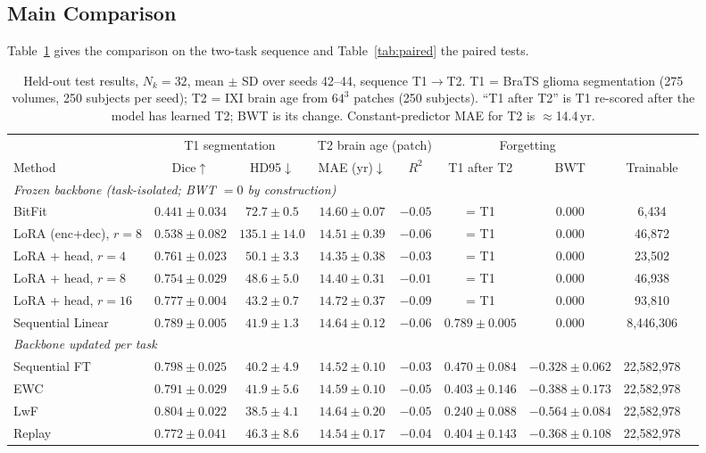 \documentclass[journal,twoside,web]{ieeecolor}
\begin{document}
\subsection{Main Comparison}
\label{sec:main}

Table~\ref{tab:main} gives the comparison on the two-task sequence and Table~\ref{tab:paired} the paired tests.

\begin{table}[t]
\caption{Held-out test results, $N_k=32$, mean $\pm$ SD over seeds 42--44, sequence T1$\to$T2. T1 = BraTS glioma segmentation (275 volumes, 250 subjects per seed); T2 = IXI brain age from $64^3$ patches (250 subjects). ``T1 after T2'' is T1 re-scored after the model has learned T2; BWT is its change. Constant-predictor MAE for T2 is $\approx$14.4\,yr.}
\label{tab:main}
\centering
\scriptsize
\setlength{\tabcolsep}{3pt}
\begin{tabular}{lcccccccr}
\toprule
 & \multicolumn{2}{c}{T1 segmentation} & \multicolumn{2}{c}{T2 brain age (patch)} & \multicolumn{2}{c}{Forgetting} & \\
\cmidrule(lr){2-3} \cmidrule(lr){4-5} \cmidrule(lr){6-7}
Method & Dice$\uparrow$ & HD95$\downarrow$ & MAE (yr)$\downarrow$ & $R^2$ & T1 after T2 & BWT & Trainable \\
\midrule
\multicolumn{8}{l}{\emph{Frozen backbone (task-isolated; BWT $=0$ by construction)}} \\
BitFit                    & $0.441\pm0.034$ & $72.7\pm0.5$ & $14.60\pm0.07$ & $-0.05$ & = T1 & 0.000 & 6,434 \\
LoRA (enc+dec), $r{=}8$   & $0.538\pm0.082$ & $135.1\pm14.0$ & $14.51\pm0.39$ & $-0.06$ & = T1 & 0.000 & 46,872 \\
LoRA + head, $r{=}4$      & $0.761\pm0.023$ & $50.1\pm3.3$ & $14.35\pm0.38$ & $-0.03$ & = T1 & 0.000 & 23,502 \\
LoRA + head, $r{=}8$      & $0.754\pm0.029$ & $48.6\pm5.0$ & $14.40\pm0.31$ & $-0.01$ & = T1 & 0.000 & 46,938 \\
LoRA + head, $r{=}16$     & $0.777\pm0.004$ & $43.2\pm0.7$ & $14.72\pm0.37$ & $-0.09$ & = T1 & 0.000 & 93,810 \\
Sequential Linear         & $0.789\pm0.005$ & $41.9\pm1.3$ & $14.64\pm0.12$ & $-0.06$ & $0.789\pm0.005$ & $0.000$ & 8,446,306 \\
\midrule
\multicolumn{8}{l}{\emph{Backbone updated per task}} \\
Sequential FT             & $0.798\pm0.025$ & $40.2\pm4.9$ & $14.52\pm0.10$ & $-0.03$ & $0.470\pm0.084$ & $-0.328\pm0.062$ & 22,582,978 \\
EWC                       & $0.791\pm0.029$ & $41.9\pm5.6$ & $14.59\pm0.10$ & $-0.05$ & $0.403\pm0.146$ & $-0.388\pm0.173$ & 22,582,978 \\
LwF                       & $\mathbf{0.804\pm0.022}$ & $\mathbf{38.5\pm4.1}$ & $14.64\pm0.20$ & $-0.05$ & $0.240\pm0.088$ & $-0.564\pm0.084$ & 22,582,978 \\
Replay                    & $0.772\pm0.041$ & $46.3\pm8.6$ & $14.54\pm0.17$ & $-0.04$ & $0.404\pm0.143$ & $-0.368\pm0.108$ & 22,582,978 \\
\bottomrule
\end{tabular}
\end{table}
\end{document}
